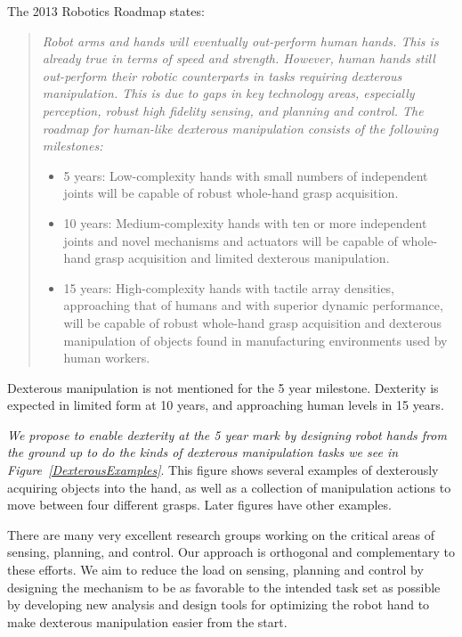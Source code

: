 The 2013 Robotics Roadmap \cite{christensen2009roadmap} states:
\begin{quotation}
{\small \it
Robot arms and hands will eventually out-perform human hands. This is already true in terms of speed and strength. However, human hands still out-perform their robotic counterparts in tasks requiring dexterous manipulation. This is due to gaps in key technology areas, especially perception, robust high fidelity sensing, and planning and control. The roadmap for human-like dexterous manipulation consists of the following milestones:
\begin{itemize}
	\item 5 years: Low-complexity hands with small numbers of independent joints will be capable of robust whole-hand grasp acquisition.
	\item 10 years: Medium-complexity hands with ten or more independent joints and novel mechanisms and actuators will be capable of whole-hand grasp acquisition and limited dexterous manipulation.
	\item 15 years: High-complexity hands with tactile array densities, approaching that of humans and with superior dynamic performance, will be capable of robust whole-hand grasp acquisition and dexterous manipulation of objects found in manufacturing environments used by human workers.
\end{itemize}}
\end{quotation}
Dexterous manipulation is not mentioned for the 5 year milestone.   Dexterity is expected in limited form at 10 years, and approaching human levels in 15 years.

{\it We propose to enable dexterity at the 5 year mark by designing robot hands from the ground up to do the kinds of dexterous manipulation tasks we see in Figure~\ref{DexterousExamples}}.   This figure shows several examples of dexterously acquiring objects into the hand, as well as a collection of manipulation actions to move between four different grasps.  Later figures have other examples.

There are many very excellent research groups working on the critical areas of sensing, planning, and control.   Our approach is orthogonal and complementary to these efforts.    We aim to reduce the load on sensing, planning and control by designing the mechanism to be as favorable to the intended task set as possible by developing new analysis and design tools for optimizing the robot hand to make dexterous manipulation easier from the start.

